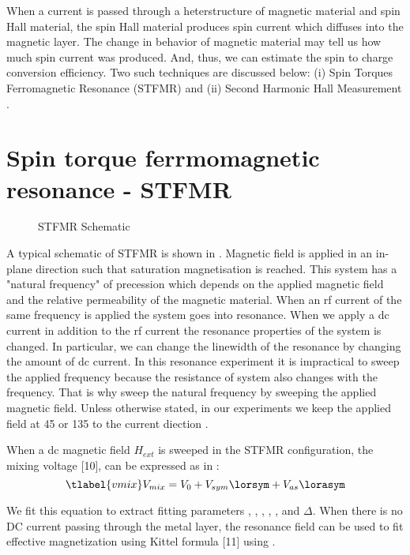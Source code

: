 When a current is passed through a heterstructure of magnetic material and spin Hall material,
the spin Hall material produces spin current which diffuses into the magnetic layer. The change
in behavior of magnetic material may tell us how much spin current was produced. And, thus, we can
estimate the spin to charge conversion efficiency. Two such techniques are discussed below: 
(i) Spin Torques Ferromagnetic Resonance (STFMR) \cite{Resonance2019} and (ii) Second Harmonic Hall Measurement \cite{Harder2016, Avci2014f}.


\section{Spin torque ferrmomagnetic resonance - STFMR}

\begin{figure}
    \caption{
        STFMR Schematic
    }
\end{figure}

A typical schematic of STFMR is shown in . Magnetic field is applied in an in-plane
direction such that saturation magnetisation is reached. This system has a "natural frequency" 
of precession which depends on the applied magnetic field and the relative permeability of the magnetic
material. When an rf current of the same frequency is applied the system goes into resonance.
When we apply a dc current in addition to the rf current the resonance properties of the system is changed.
In particular, we can change the linewidth of the resonance by changing the amount of dc current.
In this resonance experiment it is impractical to sweep the applied frequency because the 
resistance of system also changes with the frequency. That is why sweep the natural frequency by
sweeping the applied magnetic field. Unless otherwise stated, in our experiments we keep the applied
field at 45 \degree or 135 \degree to the current diection \cite{Resonance2019}.

When a dc magnetic field $H_{ext}$ is sweeped in the STFMR configuration, the mixing 
voltage [10], can be expressed as in :
\begin{equation}
    \tlabel{vmix}
    V_{mix} = V_{0} + V_{sym} \lorsym + V_{as} \lorasym
\end{equation}

We fit this equation to extract fitting parameters \vo, \hres, \vsym, \vas, \hres, and $\Delta$. 
When there is no DC current passing through the metal layer, the resonance field can be used to 
fit effective magnetization using Kittel formula [11] using .

